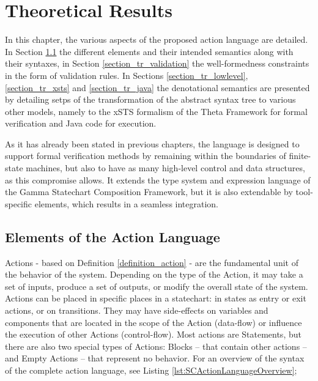\chapter{Theoretical Results} \label{chapter_theoreticalResults}
In this chapter, the various aspects of the proposed action language are detailed. In Section \ref{section_tr_elements} the different elements and their intended semantics along with their syntaxes, in Section \ref{section_tr_validation} the well-formedness constraints in the form of validation rules. In Sections \ref{section_tr_lowlevel}, \ref{section_tr_xsts} and \ref{section_tr_java} the denotational semantics are presented by detailing setps of the transformation of the abstract syntax tree to various other models, namely to the xSTS formalism of the Theta Framework for formal verification and Java code for execution.

As it has already been stated in previous chapters, the language is designed to support formal verification methods by remaining within the boundaries of finite-state machines, but also to have as many high-level control and data structures, as this compromise allows. It extends the type system and expression language of the Gamma Statechart Composition Framework, but it is also extendable by tool-specific elements, which results in a seamless integration.

\section{Elements of the Action Language} \label{section_tr_elements}
Actions - based on Definition \ref{definition_action} - are the fundamental unit of the behavior of the system. Depending on the type of the Action, it may take a set of inputs, produce a set of outputs, or modify the overall state of the system. Actions can be placed in specific places in a statechart: in states as entry or exit actions, or on transitions. They may have side-effects on variables and components that are located in the scope of the Action (data-flow) or influence the execution of other Actions (control-flow). Most actions are Statements, but there are also two special types of Actions: Blocks -- that contain other actions -- and Empty Actions -- that represent no behavior. For an overview of the syntax of the complete action language, see Listing \ref{lst:SCActionLanguageOverview};

